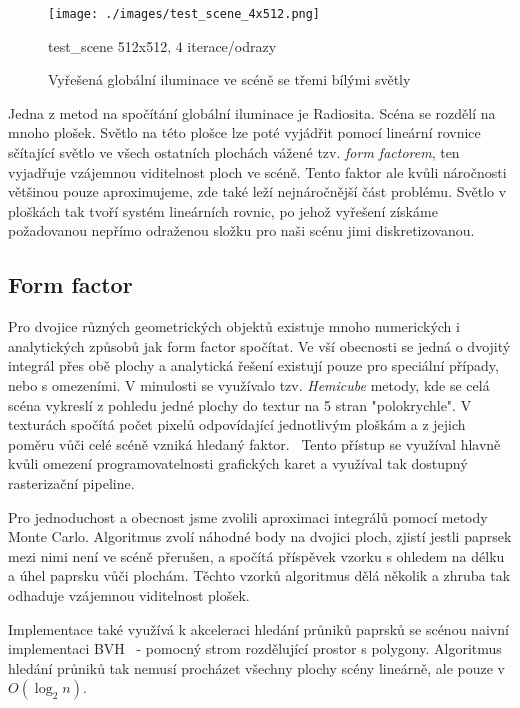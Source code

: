 \documentclass[czech]{pyt-report}
\begin{document}
\begin{figure}[h]
  \centering\leavevmode
  \texttt{[image: ./images/test\_scene\_4x512.png]}\vskip-0.5cm
  \bigskip
  \caption{Vyřešená globální iluminace ve scéně se třemi bílými světly}
  \smallskip
  \small test\_scene 512x512, 4 iterace/odrazy
  \label{fig:test_scene}
\end{figure}

Jedna z metod na spočítání globální iluminace je Radiosita. Scéna se rozdělí na mnoho plošek. Světlo na této plošce lze poté vyjádřit pomocí lineární rovnice sčítající světlo ve všech ostatních plochách vážené tzv. \textit{form factorem}, ten vyjadřuje vzájemnou viditelnost ploch ve scéně. Tento faktor ale kvůli náročnosti většinou pouze aproximujeme, zde také leží nejnáročnější část problému. Světlo v ploškách tak tvoří systém lineárních rovnic, po jehož vyřešení získáme požadovanou nepřímo odraženou složku pro naši scénu jimi diskretizovanou.~\cite{Cohen1993}

\subsection{Form factor}
\label{sec:radiosita-form}

Pro dvojice různých geometrických objektů existuje mnoho numerických i analytických způsobů jak form factor spočítat. Ve vší obecnosti se jedná o dvojitý integrál přes obě plochy a analytická řešení existují pouze pro speciální případy, nebo s omezeními. V minulosti se využívalo tzv. \textit{Hemicube} metody, kde se celá scéna vykreslí z pohledu jedné plochy do textur na 5 stran "polokrychle". V texturách spočítá počet pixelů odpovídající jednotlivým ploškám a z jejich poměru vůči celé scéně vzniká hledaný faktor.~\cite{CastanoHemicube} Tento přístup se využíval hlavně kvůli omezení programovatelnosti grafických karet a využíval tak dostupný rasterizační pipeline.

Pro jednoduchost a obecnost jsme zvolili aproximaci integrálů pomocí metody Monte Carlo. Algoritmus zvolí náhodné body na dvojici ploch, zjistí jestli paprsek mezi nimi není ve scéně přerušen, a spočítá příspěvek vzorku s ohledem na délku a úhel paprsku vůči plochám. Těchto vzorků algoritmus dělá několik a zhruba tak odhaduje vzájemnou viditelnost plošek.\cite{DutreCompendium}

Implementace také využívá k akceleraci hledání průniků paprsků se scénou naivní implementaci BVH~\cite{Shirley2024RTW2} - pomocný strom rozdělující prostor s polygony. Algoritmus hledání průniků tak nemusí procházet všechny plochy scény lineárně, ale pouze v $O(\log_2n)$.
\end{document}
